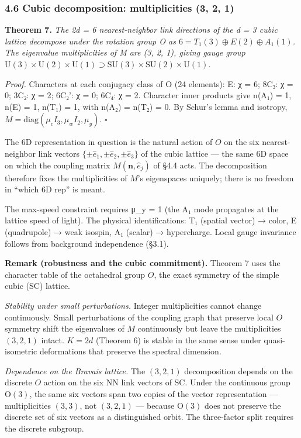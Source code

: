 \documentclass[
]{article}
\begin{document}
\hypertarget{cubic-decomposition-multiplicities-3-2-1}{%
\subsubsection{4.6 Cubic decomposition: multiplicities (3, 2,
1)}\label{cubic-decomposition-multiplicities-3-2-1}}

\textbf{Theorem 7.} \emph{The 2d = 6 nearest-neighbor link directions of
the d = 3 cubic lattice decompose under the rotation group O as
\(6 = T_1(3) \oplus E(2) \oplus A_1(1)\). The eigenvalue multiplicities
of M are (3, 2, 1), giving gauge group
\(\mathrm{U}(3) \times \mathrm{U}(2) \times \mathrm{U}(1) \supset \mathrm{SU}(3) \times \mathrm{SU}(2) \times \mathrm{U}(1)\).}

\emph{Proof.} Characters at each conjugacy class of O (24 elements): E:
χ = 6; 8C₃: χ = 0; 3C₂: χ = 2; 6C₂': χ = 0; 6C₄: χ = 2. Character inner
products give n(A₁) = 1, n(E) = 1, n(T₁) = 1, with n(A₂) = n(T₂) = 0. By
Schur's lemma and isotropy,
\(M = \mathrm{diag}(\mu_c I_3, \mu_w I_2, \mu_y)\). \(\square\)

The 6D representation in question is the natural action of \(O\) on the
six nearest-neighbor link vectors
\(\{\pm\hat e_1, \pm\hat e_2, \pm\hat e_3\}\) of the cubic lattice ---
the same 6D space on which the coupling matrix
\(M(\mathbf{n}, \hat e_j)\) of §4.4 acts. The decomposition therefore
fixes the multiplicities of \(M\)'s eigenspaces uniquely; there is no
freedom in ``which 6D rep'' is meant.

The max-speed constraint requires μ\_y = 1 (the A₁ mode propagates at
the lattice speed of light). The physical identifications: T₁ (spatial
vector) → color, E (quadrupole) → weak isospin, A₁ (scalar) →
hypercharge. Local gauge invariance follows from background independence
(§3.1).

\textbf{Remark (robustness and the cubic commitment).} Theorem 7 uses
the character table of the octahedral group \(O\), the exact symmetry of
the simple cubic (SC) lattice.

\emph{Stability under small perturbations.} Integer multiplicities
cannot change continuously. Small perturbations of the coupling graph
that preserve local \(O\) symmetry shift the eigenvalues of \(M\)
continuously but leave the multiplicities \((3, 2, 1)\) intact.
\(K = 2d\) (Theorem 6) is stable in the same sense under quasi-isometric
deformations that preserve the spectral dimension.

\emph{Dependence on the Bravais lattice.} The \((3, 2, 1)\)
decomposition depends on the discrete \(O\) action on the six NN link
vectors of SC. Under the continuous group \(\mathrm{O}(3)\), the same
six vectors span two copies of the vector representation ---
multiplicities \((3, 3)\), not \((3, 2, 1)\) --- because
\(\mathrm{O}(3)\) does not preserve the discrete set of six vectors as a
distinguished orbit. The three-factor split requires the discrete
subgroup.
\end{document}
